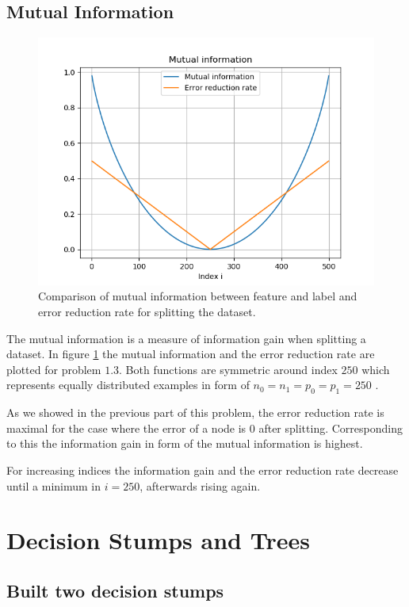 \documentclass[12pt]{article}
\begin{document}
\subsection{Mutual Information}

\begin{figure}[t!]
	\centering
	\includegraphics[width=0.65\linewidth]{../Problem_1/Figure_1.png}
	\caption{Comparison of mutual information between feature and label and error reduction rate for splitting the dataset.}
	\label{fig:1.3}
\end{figure}

The mutual information is a measure of information gain when splitting a dataset. In figure \ref{fig:1.3} the mutual information and the error reduction rate are plotted for problem $1.3$. Both functions are symmetric around index $250$ which represents equally distributed examples in form of $n_0=n_1=p_0=p_1=250$ . \par 
As we showed in the previous part of this problem, the error reduction rate is maximal for the case where the error of a node is $0$ after splitting. Corresponding to this the information gain in form of the mutual information is highest. \par
For increasing indices the information gain and the error reduction rate decrease until a minimum in $i=250$, afterwards rising again.    

\section{Decision Stumps and Trees}

\subsection{Built two decision stumps}
\end{document}
